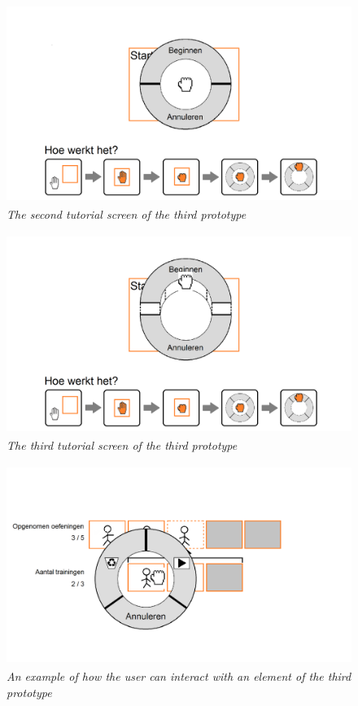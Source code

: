 \begin{figure}[H]
	\begin{center}
		\includegraphics[width=12cm, height=6.5cm]{figures/prototype_8_6_tutorial_2.png}
		\caption{\emph{The second tutorial screen of the third prototype}}
		\label{second tutorial last prototype}
	\end{center}
\end{figure}

\begin{figure}[H]
	\begin{center}
		\includegraphics[width=12cm, height=6.5cm]{figures/prototype_9_6_tutorial_3.png}
		\caption{\emph{The third tutorial screen of the third prototype}}
		\label{third tutorial last prototype}
	\end{center}
\end{figure}

\begin{figure}[H]
	\begin{center}
		\includegraphics[width=12cm, height=6.5cm]{figures/prototype_10_6_example.png}
		\caption{\emph{An example of how the user can interact with an element of the third prototype}}
		\label{example last prototype}
	\end{center}
\end{figure}



